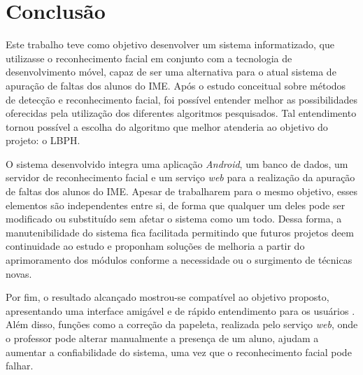 \chapter{Conclusão}
\noindent
Este trabalho teve como objetivo desenvolver um sistema informatizado, que utilizasse o reconhecimento facial em conjunto com a tecnologia de desenvolvimento móvel, capaz de ser uma alternativa para o atual sistema de apuração de faltas dos alunos do IME. Após o estudo conceitual sobre métodos de detecção e reconhecimento facial, foi possível  entender melhor as possibilidades oferecidas pela utilização dos diferentes algoritmos pesquisados. Tal entendimento tornou possível a escolha do algoritmo que melhor atenderia ao objetivo do projeto: o LBPH.

O sistema desenvolvido integra uma aplicação \textit{Android}, um banco de dados, um servidor de reconhecimento facial e  um serviço \textit{web} para a realização da apuração de faltas dos alunos do IME. Apesar de trabalharem para o mesmo objetivo, esses elementos são independentes entre si, de forma que qualquer um deles pode ser modificado ou substituído sem afetar o sistema como um todo. Dessa forma, a manutenibilidade do sistema fica facilitada permitindo que futuros projetos deem continuidade ao estudo e proponham soluções de melhoria a partir do aprimoramento dos módulos conforme a necessidade ou o surgimento de técnicas novas.

Por fim, o resultado alcançado mostrou-se compatível ao objetivo proposto, apresentando uma interface amigável e de rápido entendimento para os usuários . Além disso, funções como a correção da papeleta, realizada pelo serviço \textit{web}, onde o professor pode alterar manualmente a presença de um aluno, ajudam a aumentar a confiabilidade do sistema, uma vez que o reconhecimento facial pode falhar. %



